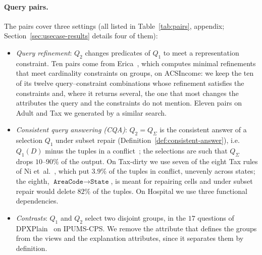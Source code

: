 \paragraph{Query pairs.}
The pairs cover three settings (all listed in Table~\ref{tab:pairs}, appendix; Section~\ref{sec:usecase-results} details four of them):
\begin{itemize}[leftmargin=*,itemsep=1pt,topsep=2pt]
  \item \emph{Query refinement}: $Q_2$ changes predicates of $Q_1$ to meet a representation constraint. Ten pairs come from Erica~\cite{LMSJ23}, which computes minimal refinements that meet cardinality constraints on groups, on ACSIncome: we keep the ten of its twelve query--constraint combinations whose refinement satisfies the constraints and, where it returns several, the one that most changes the attributes the query and the constraints do not mention. Eleven pairs on Adult and Tax we generated by a similar search.
  \item \emph{Consistent query answering (CQA)}: $Q_2=Q_\Sigma$ is the consistent answer of a selection $Q_1$ under subset repair (Definition~\ref{def:consistent-answer}), i.e.\ $Q_1(D)$ minus the tuples in a conflict~\cite{chomicki2004}; the selections are such that $Q_\Sigma$ drops $10$--$90\%$ of the output. On Tax-dirty we use seven of the eight Tax rules of Ni et~al.~\cite{NiMZWLY24}, which put $3.9\%$ of the tuples in conflict, unevenly across states; the eighth, $\texttt{AreaCode}\to\texttt{State}$, is meant for repairing cells and under subset repair would delete $82\%$ of the tuples. On Hospital we use three functional dependencies.
  \item \emph{Contrasts}: $Q_1$ and $Q_2$ select two disjoint groups, in the $17$ questions of DPXPlain~\cite{TaoGMR22} on IPUMS-CPS. We remove the attribute that defines the groups from the views and the explanation attributes, since it separates them by definition.
\end{itemize}

